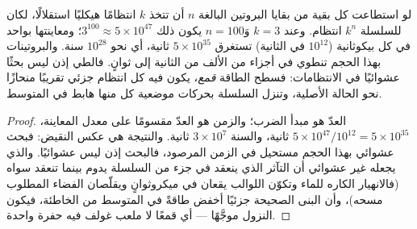 \begin{theorem}\label{thm:b3:structural-biology:levinthal}
لو استطاعت كل بقية من بقايا البروتين البالغة $n$ أن تتخذ $k$
انتظامًا هيكليًا استقلالًا، لكان للسلسلة $k^{n}$
انتظام. وعند $k = 3$ وَ$n = 100$ يكون ذلك $3^{100} \approx
5\times 10^{47}$؛ ومعاينتها بواحد في كل بيكوثانية ($10^{12}$ في
الثانية) تستغرق $5\times 10^{35}$ ثانية، أي نحو $10^{28}$ سنة.
والبروتينات بهذا الحجم تنطوي في أجزاء من الألف من الثانية إلى ثوانٍ. فالطي
إذن ليس بحثًا عشوائيًا في الانتظامات: فسطح الطاقة
\emph{قمع}، يكون فيه كل انتظام جزئي تقريبًا
منحازًا نحو الحالة الأصلية، وتنزل السلسلة بحركات
موضعية كل منها هابط في المتوسط.
\end{theorem}
\begin{proof}
العدّ هو مبدأ الضرب؛ والزمن هو العدّ
مقسومًا على معدل المعاينة، $5\times 10^{47}/10^{12} = 5\times
10^{35}$ ثانية، والسنة $3\times 10^{7}$ ثانية. والنتيجة هي
عكس النقيض: فبحث عشوائي بهذا الحجم مستحيل في
الزمن المرصود، فالبحث إذن ليس عشوائيًا. والذي يجعله غير عشوائي
أن التآثر الذي ينعقد في جزء من السلسلة يدوم بينما
تنعقد سواه (فالانهيار الكاره للماء وتكوّن اللوالب يقعان في
ميكروثوانٍ ويقلّصان الفضاء المطلوب مسحه)، وأن البنى الصحيحة
جزئيًا أخفض طاقةً في المتوسط من الخاطئة، فيكون
النزول موجَّهًا --- أي قمعًا لا ملعب غولف فيه
حفرة واحدة.
\end{proof}

